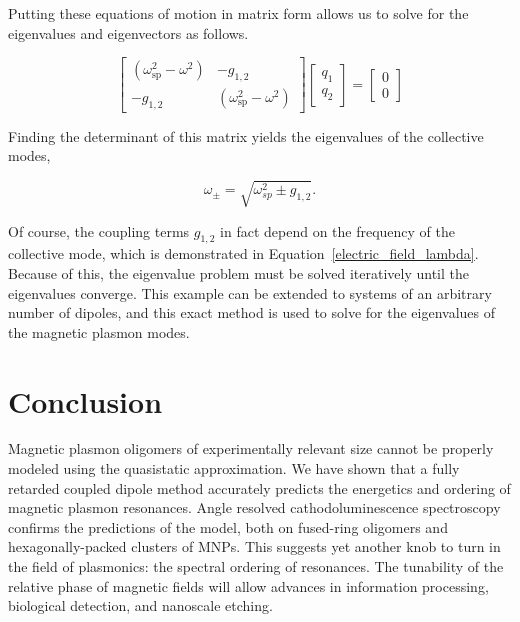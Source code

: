 \documentclass[journal=apchd5,manuscript=article]{achemso}
\begin{document}
Putting these equations of motion in matrix form allows us to solve for the eigenvalues and eigenvectors as follows.

\begin{equation}
\begin{bmatrix}
(\omega_{\textrm{sp}}^2-\omega^2) & -g_{1,2}\\
-g_{1,2} & (\omega_{\textrm{sp}}^2-\omega^2)
\end{bmatrix}
\begin{bmatrix}
q_1\\
q_2
\end{bmatrix}
=
\begin{bmatrix}
0\\
0
\end{bmatrix}
\label{eom_matrix}
\end{equation}

Finding the determinant of this matrix yields the eigenvalues of the collective modes,

\begin{equation}
\omega_{\pm} = \sqrt{\omega_{sp}^2 \pm g_{1,2}}.
\label{eigenvalues}
\end{equation}

\noindent Of course, the coupling terms $g_{1,2}$ in fact depend on the frequency of the collective mode, which is demonstrated in Equation~\ref{electric_field_lambda}. Because of this, the eigenvalue problem must be solved iteratively until the eigenvalues converge. This example can be extended to systems of an arbitrary number of dipoles, and this exact method is used to solve for the eigenvalues of the magnetic plasmon modes.

\section{Conclusion}
Magnetic plasmon oligomers of experimentally relevant size cannot be properly modeled using the quasistatic approximation. We have shown that a fully retarded coupled dipole method accurately predicts the energetics and ordering of magnetic plasmon resonances. Angle resolved cathodoluminescence spectroscopy confirms the predictions of the model, both on fused-ring oligomers and hexagonally-packed clusters of MNPs. This suggests yet another knob to turn in the field of plasmonics: the spectral ordering of resonances. The tunability of the relative phase of magnetic fields will allow advances in information processing, biological detection, and nanoscale etching.
\end{document}
